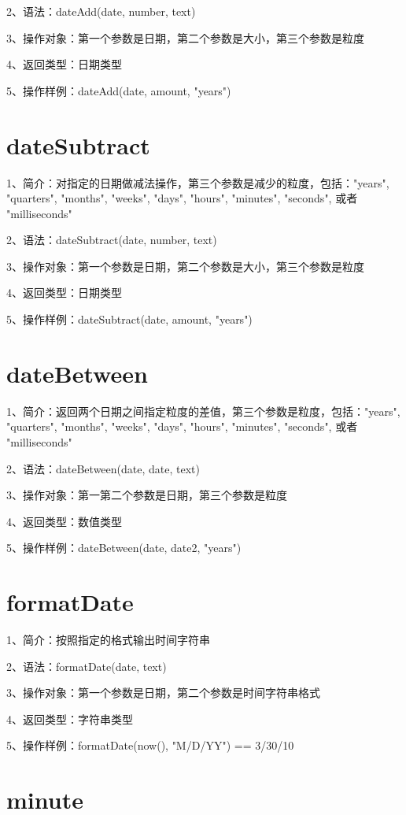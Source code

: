 2、语法：dateAdd(date, number, text)

3、操作对象：第一个参数是日期，第二个参数是大小，第三个参数是粒度

4、返回类型：日期类型

5、操作样例：dateAdd(date, amount, "years")

\section{dateSubtract}

1、简介：对指定的日期做减法操作，第三个参数是减少的粒度，包括："years", "quarters", "months", "weeks", "days", "hours", "minutes", "seconds", 或者 "milliseconds"

2、语法：dateSubtract(date, number, text)

3、操作对象：第一个参数是日期，第二个参数是大小，第三个参数是粒度

4、返回类型：日期类型

5、操作样例：dateSubtract(date, amount, "years")

\section{dateBetween}

1、简介：返回两个日期之间指定粒度的差值，第三个参数是粒度，包括："years", "quarters", "months", "weeks", "days", "hours", "minutes", "seconds", 或者 "milliseconds"

2、语法：dateBetween(date, date, text)

3、操作对象：第一第二个参数是日期，第三个参数是粒度

4、返回类型：数值类型

5、操作样例：dateBetween(date, date2, "years")

\section{formatDate}

1、简介：按照指定的格式输出时间字符串

2、语法：formatDate(date, text)

3、操作对象：第一个参数是日期，第二个参数是时间字符串格式

4、返回类型：字符串类型

5、操作样例：formatDate(now(), "M/D/YY") == 3/30/10

\section{minute}

